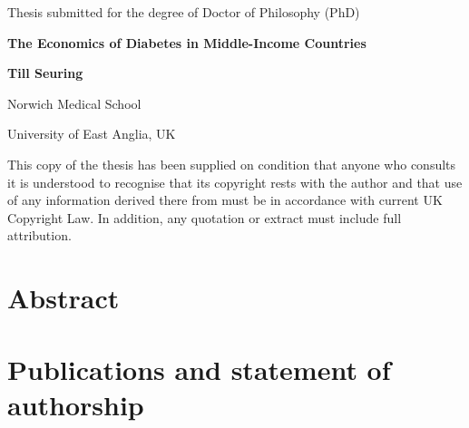 


%
\date{\today}
\makeatletter
\begin{titlepage}
\centering
\vfill
Thesis submitted for the degree of Doctor of Philosophy (PhD)
\par
\vspace*{1in}
\begin{Large}\bfseries
The Economics of Diabetes in Middle-Income Countries\par
\end{Large}
\vspace{1in}
\begin{large}\bfseries
Till Seuring\par
\end{large}
\par
\vspace{0.2in}
Norwich Medical School
\par
University of East Anglia, UK
\par
\vspace{1.0in}
\@date
\par
\vspace{2.0in}
This copy of the thesis has been supplied on condition that anyone who consults it is
understood to recognise that its copyright rests with the author and that use of any
information derived there from must be in accordance with current UK Copyright Law.
In addition, any quotation or extract must include full attribution.
\end{titlepage}
\makeatother

\cleardoublepage
{}
\chapter*{\label{abstract}Abstract}


\tableofcontents

\cleardoublepage
{}
\listoffigures

\cleardoublepage
{} 
\listoftables
\cleardoublepage

\chapter*{\label{publication_statement}Publications and statement of authorship}


